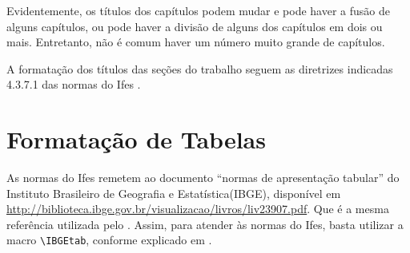 \documentclass[times,english,brazil,oneside,section=TITLE]{ifes8}
\begin{document}
Evidentemente, os títulos dos capítulos podem mudar e pode haver a
fusão de alguns capítulos, ou pode haver a divisão de alguns dos
capítulos em dois ou mais. Entretanto, não é comum haver um número
muito grande de capítulos.

A formatação dos títulos das seções do trabalho seguem as diretrizes
indicadas 4.3.7.1 das normas do Ifes \cite[p.~34]{Ifes2017}.



\section{Formatação de Tabelas}
\label{sec:format-tabelas}

As normas do Ifes remetem ao documento ``normas de apresentação
tabular'' do Instituto Brasileiro de Geografia e Estatística(IBGE),
disponível em
\url{http://biblioteca.ibge.gov.br/visualizacao/livros/liv23907.pdf}.
Que é a mesma referência utilizada pelo \abnTeX. Assim, para atender
às normas do Ifes, basta utilizar a macro \verb!\IBGEtab!, conforme
explicado em \cite[p.~41]{Araujo2016}.
\end{document}
